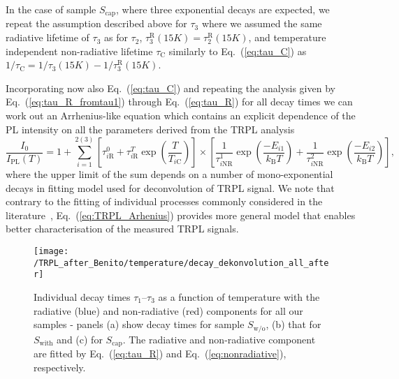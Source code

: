 In the case of sample $S_\mathrm{cap}$, where three exponential decays are expected, we repeat the assumption described above for $\tau_3$ where we assumed the same radiative lifetime of $\tau_3$ as for $\tau_2$, $\tau_3^\mathrm{R}(15K)=\tau_2^\mathrm{R}(15K)$, and temperature independent non-radiative lifetime $\tau_\mathrm{C}$ similarly to Eq.~(\ref{eq:tau_C}) as $1 / \tau_\mathrm{C} = 1/ \tau_3(15K)-1/ \tau_3^\mathrm{R}(15K)$.


Incorporating now also Eq.~(\ref{eq:tau_C}) and repeating the analysis given by Eq.~(\ref{eq:tau_R_fromtau1}) through Eq.~(\ref{eq:tau_R}) for all decay times we can work out an Arrhenius-like equation which contains an explicit dependence of the PL intensity on all the parameters derived from the TRPL analysis
%
\begin{equation}
\frac{I_0}{I_\mathrm{PL}(T)}=1+\sum_{i=1}^{2(3)} {\left[\tau_{i\mathrm{R}}^0+\tau_{i\mathrm{R}}^T\exp{\left(\frac{T}{T_{i\mathrm{C}}}\right)}\right] \times \left[\frac{1}{\tau_{i\mathrm{NR}}^1}\exp{\left(\frac{-E_{i1}}{k_\mathrm{B}T}\right)} + \frac{1}{\tau_{i\mathrm{NR}}^2}\exp{\left(\frac{-E_{i2}}{k_\mathrm{B}T}\right)}\right]}, \label{eq:TRPL_Arhenius}
\end{equation}
%
where the upper limit of the sum depends on a number of mono-exponential decays in fitting model used for deconvolution of TRPL signal. We note that contrary to the fitting of individual processes commonly considered in the literature~\cite{t_alvarez}, Eq.~(\ref{eq:TRPL_Arhenius}) provides more general model that enables better characterisation of the measured TRPL signals.
%
\begin{figure}
	\centering
	\texttt{[image: /TRPL\_after\_Benito/temperature/decay\_dekonvolution\_all\_after]}
	\caption{Individual decay times $\tau_1$--$\tau_3$ as a function of temperature with the radiative (blue) and non-radiative (red) components for all our samples - panels (a) show decay times for sample $S_\mathrm{w/o}$, (b) that for $S_\mathrm{with}$ and (c) for $S_\mathrm{cap}$. The radiative and non-radiative component are fitted by Eq.~(\ref{eq:tau_R}) and Eq.~(\ref{eq:nonradiative}), respectively.}
	\label{fig:TRPL_temp_decon}
\end{figure}


